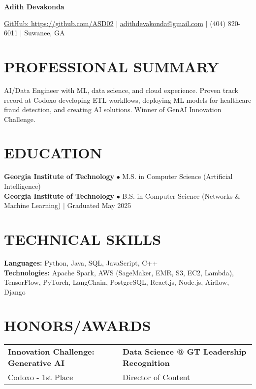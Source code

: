\documentclass[10pt,a4paper]{article}
\begin{document}
\begin{center}
    {\Large \bfseries Adith Devakonda}
    \vspace{2pt}
    
    \href{https://github.com/ASD02}{GitHub: https://github.com/ASD02} $|$
    \href{mailto:adithdevakonda@gmail.com}{adithdevakonda@gmail.com} $|$
    (404) 820-6011 $|$
    Suwanee, GA
\end{center}

\section*{PROFESSIONAL SUMMARY}
AI/Data Engineer with ML, data science, and cloud experience. Proven track record at Codoxo developing ETL workflows, deploying ML models for healthcare fraud detection, and creating AI solutions. Winner of GenAI Innovation Challenge.

\section*{EDUCATION}
\textbf{Georgia Institute of Technology} $\bullet$ M.S. in Computer Science (Artificial Intelligence) \\
\textbf{Georgia Institute of Technology} $\bullet$ B.S. in Computer Science (Networks \& Machine Learning) $|$ Graduated May 2025

\section*{TECHNICAL SKILLS}
\textbf{Languages:} Python, Java, SQL, JavaScript, C++ \\
\textbf{Technologies:} Apache Spark, AWS (SageMaker, EMR, S3, EC2, Lambda), TensorFlow, PyTorch, LangChain, PostgreSQL, React.js, Node.js, Airflow, Django

\section*{HONORS/AWARDS}
\begin{tabular}{@{}p{} p{}@{}}
\textbf{Innovation Challenge: Generative AI} & \textbf{Data Science @ GT Leadership Recognition} \\
Codoxo - 1st Place & Director of Content \\
\end{tabular}
\end{document}
